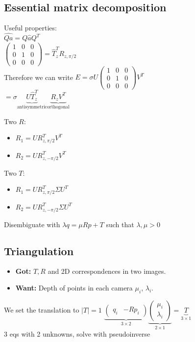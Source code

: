 \subsection*{Essential matrix decomposition}
Useful properties: \\
$\hat{Q a} = Q \hat{a} Q^T$\\
$\begin{pmatrix}
  1 & 0 & 0 \\ 0 & 1 & 0 \\ 0& 0& 0
\end{pmatrix} =\hat{T}^T_z R_{z, \pi/2}$ \\
Therefore we can write
$E = \sigma U
\begin{pmatrix}
  1 & 0 & 0 \\ 0 & 1 & 0 \\ 0& 0& 0
\end{pmatrix} V^T$\\
$=\sigma \underbrace{U \hat{T}^T_z}_{\text{antisymmetric}}
\underbrace{R_z V^T}_{\text{orthogonal}}$

Two $R$:
\begin{itemize}
  \item $R_1 = U R^T_{z, \pi/2} V^T$
  \item $R_2 = U R^T_{z, -\pi/2} V^T$
\end{itemize}
Two $T$:
\begin{itemize}
  \item $R_1 = U R^T_{z, \pi/2} \Sigma U^T$
  \item $R_2 = U R^T_{z, -\pi/2} \Sigma U^T$
\end{itemize}

Disembiguate with $\lambda q = \mu R p + T$ such that $\lambda, \mu > 0$

\subsection*{Triangulation}
\begin{itemize}
  \item \textbf{Got:} $T, R$ and 2D correspondences in two images.
  \item \textbf{Want:} Depth of points in each camera $\mu_i$, $\lambda_i$.
\end{itemize}

We set the translation to $|T| = 1$
$\underbrace{\begin{pmatrix}q_i & -R p_i\end{pmatrix}}_{3\times2}
\underbrace{\begin{pmatrix} \mu_i \\\lambda_i \end{pmatrix}}_{2\times1} =
\underbrace{T}_{3 \times 1}$\\
3 eqs with 2 unknowns, solve with pseudoinverse

